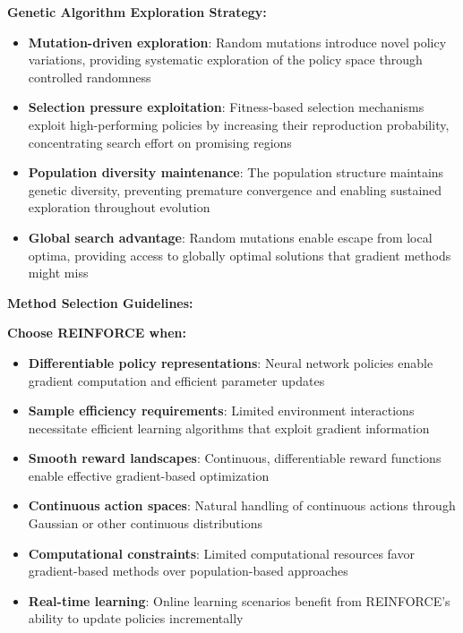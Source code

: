 \documentclass[12pt]{article}
\begin{document}
{{{\textbf{Genetic Algorithm Exploration Strategy:}
\begin{itemize}
    \item \textbf{Mutation-driven exploration}: Random mutations introduce novel policy variations, providing systematic exploration of the policy space through controlled randomness
    \item \textbf{Selection pressure exploitation}: Fitness-based selection mechanisms exploit high-performing policies by increasing their reproduction probability, concentrating search effort on promising regions
    \item \textbf{Population diversity maintenance}: The population structure maintains genetic diversity, preventing premature convergence and enabling sustained exploration throughout evolution
    \item \textbf{Global search advantage}: Random mutations enable escape from local optima, providing access to globally optimal solutions that gradient methods might miss
\end{itemize}

\textbf{Method Selection Guidelines:}

\textbf{Choose REINFORCE when:}
\begin{itemize}
    \item \textbf{Differentiable policy representations}: Neural network policies enable gradient computation and efficient parameter updates
    \item \textbf{Sample efficiency requirements}: Limited environment interactions necessitate efficient learning algorithms that exploit gradient information
    \item \textbf{Smooth reward landscapes}: Continuous, differentiable reward functions enable effective gradient-based optimization
    \item \textbf{Continuous action spaces}: Natural handling of continuous actions through Gaussian or other continuous distributions
    \item \textbf{Computational constraints}: Limited computational resources favor gradient-based methods over population-based approaches
    \item \textbf{Real-time learning}: Online learning scenarios benefit from REINFORCE's ability to update policies incrementally
\end{itemize}

}}}
\end{document}
